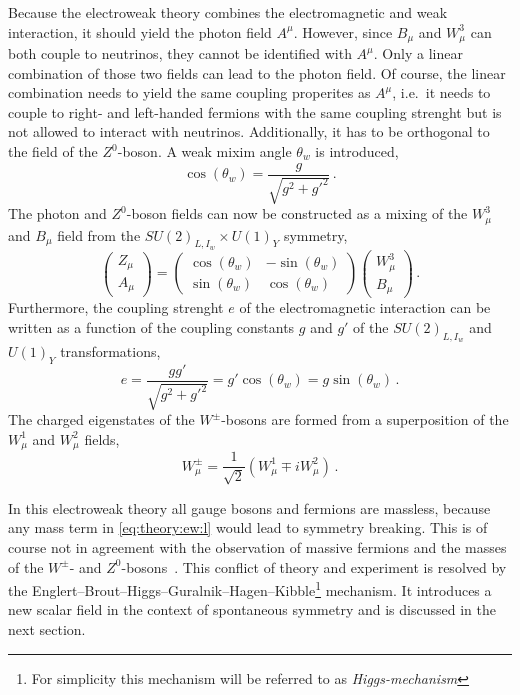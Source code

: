 Because the electroweak theory combines the electromagnetic and weak interaction, it should yield the photon field $A^\mu$.
However, since $B_\mu$ and $W_\mu^3$ can both couple to neutrinos, they cannot be identified with $A^\mu$.
Only a linear combination of those two fields can lead to the photon field.
Of course, the linear combination needs to yield the same coupling properites as $A^\mu$, i.e.\ it needs to couple to
right- and left-handed fermions with the same coupling strenght but is not allowed to interact with neutrinos.
Additionally, it has to be orthogonal to the field of the $Z^0$-boson.
A weak mixim angle $\theta_w$ is introduced,
\begin{equation}
    \cos \left( \theta_w \right) = \frac{g}{\sqrt{g^2 + {g'}^2}} \,.
\end{equation}
The photon and $Z^0$-boson fields can now be constructed as a mixing of the $W_\mu^3$ and $B_\mu$ field from the
$SU{(2)}_{L,I_w} \times U{(1)}_Y$ symmetry,
\begin{equation}
    \begin{pmatrix}
        Z_\mu \\ A_\mu
    \end{pmatrix}
    =
    \begin{pmatrix}
        \cos \left(\theta_w\right) & -\sin \left(\theta_w\right) \\
        \sin \left(\theta_w\right) & \cos \left(\theta_w\right)
    \end{pmatrix}
    \begin{pmatrix}
        W_\mu^3 \\ B_\mu
    \end{pmatrix} \,.
\end{equation}
Furthermore, the coupling strenght $e$ of the electromagnetic interaction can be written as a function
of the coupling constants $g$ and $g'$ of the $SU{(2)}_{L,I_w}$ and $U{(1)}_Y$ transformations,
\begin{equation}
    e = \frac{g g'}{\sqrt{g^2 + {g'}^2}} = g' \cos \left(\theta_w\right) = g \sin \left(\theta_w\right) \,.
\end{equation}
The charged eigenstates of the $W^\pm$-bosons are formed from a superposition of the $W_\mu^1$ and $W_\mu^2$ fields,
\begin{equation}
    W^\pm_\mu = \frac{1}{\sqrt{2}} \left(W_\mu^1 \mp i W_\mu^2 \right) \,.
\end{equation}

In this electroweak theory all gauge bosons and fermions are massless, because any mass term in \cref{eq:theory:ew:l}
would lead to symmetry breaking.
This is of course not in agreement with the observation of massive fermions and the masses of the $W^\pm$- and $Z^0$-bosons~\cite{PDG}.
This conflict of theory and experiment is resolved by the Englert--Brout--Higgs--Guralnik--Hagen--Kibble\footnote{For simplicity this mechanism will be referred to as \emph{Higgs-mechanism}} mechanism.
It introduces a new scalar field in the context of spontaneous symmetry and is discussed in the next section.


